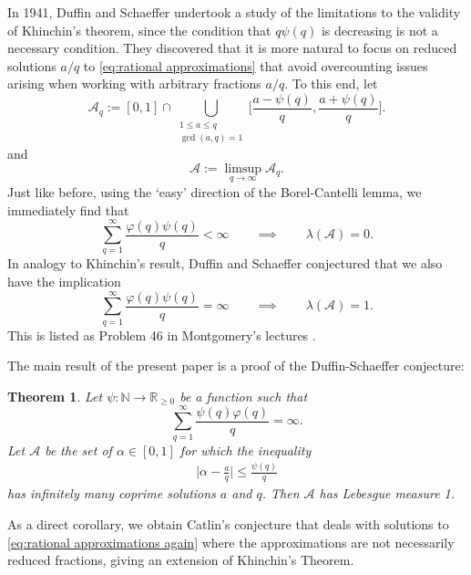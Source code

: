 \documentclass[12pt]{amsart}
\numberwithin{equation}{section}
\newtheorem{thm}{Theorem}
\theoremstyle{definition}
\theoremstyle{remark}
\newcommand{\N}{\mathbb{N}}
\newcommand{\R}{\mathbb{R}}
\newcommand{\CA}{\mathcal{A}}
\newcommand{\eq}[1]{ \begin{equation} \begin{split} #1 \end{split} \end{equation} }
\renewcommand{\phi}{\varphi}
\renewcommand{\le}{\leqslant}
\renewcommand{\ge}{\geqslant}
\begin{document}
\medskip


In 1941, Duffin and Schaeffer \cite{DS} undertook a study of the limitations to the validity of Khinchin's theorem, since the condition that $q\psi(q)$ is decreasing is not a necessary condition. They discovered that it is more natural to focus on reduced solutions $a/q$ to \eqref{eq:rational approximations} that avoid overcounting issues arising when working with arbitrary fractions $a/q$. To this end, let 
\begin{equation}\label{eq:A_q-dfn}
\CA_q:= [0,1]\cap \bigcup_{\substack{1\le a\le q \\ \gcd(a,q)=1}}  \Big[\frac{a-\psi(q)}{q}, \frac{a+\psi(q)}{q}\Big] .
\end{equation}
and
\begin{equation}\label{eq:A-dfn}
\CA:= \limsup_{q\to\infty} \CA_q.
\end{equation}
Just like before, using the `easy' direction of the Borel-Cantelli lemma, we immediately find that
\begin{equation}\label{DS-BC}
\sum_{q=1}^\infty \frac{\phi(q)\psi(q)}{q}<\infty
\qquad\implies\qquad \lambda(\CA)=0.
\end{equation}
In analogy to Khinchin's result, Duffin and Schaeffer  conjectured that we also have the implication
\begin{equation}\label{DS-conj}
\sum_{q=1}^\infty \frac{\phi(q)\psi(q)}{q}=\infty
\qquad\implies\qquad \lambda(\CA)=1.
\end{equation}
This is listed as Problem 46 in Montgomery's lectures \cite[Page 204]{montgomery}.

The main result of the present paper is a proof of the Duffin-Schaeffer conjecture:

\begin{thm}\label{thm:MainThm}
Let $\psi:\N\rightarrow \R_{\ge 0}$ be a function such that
\[
\sum_{q=1}^\infty \frac{\psi(q)\phi(q)}{q}=\infty.
\]
Let $\CA$ be the set of $\alpha\in[0,1]$ for which the inequality
\eq{
	\label{eq:rational approximations again}
\bigg|\alpha-\frac{a}{q}\bigg| \le \frac{\psi(q)}{q}
}
has infinitely many coprime solutions $a$ and $q$. 
Then $\CA$ has Lebesgue measure 1. 
\end{thm}


As a direct corollary, we obtain Catlin's conjecture \cite{catlin} that deals with solutions to \eqref{eq:rational approximations again} where the approximations are not necessarily reduced fractions, giving an extension of Khinchin's Theorem.
\end{document}
